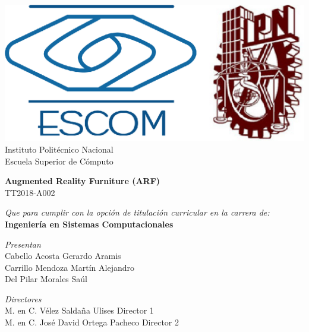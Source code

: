 
\begin{titlepage}

    \centering %

    \includegraphics[scale=0.17]{imagenes/escom-ipn} %
    \LARGE{\\ Instituto Polit\'ecnico Nacional}
    \LARGE{\\ Escuela Superior de C\'omputo}
    
    \vspace{1cm} %

    \LARGE \textbf{Augmented Reality Furniture (ARF)}
    \LARGE {\\ TT2018-A002}

    \vspace{1cm} %

    \LARGE \textit{Que para cumplir con la opción de titulación curricular en la carrera de:}
    \LARGE \textbf{\\ Ingeniería en Sistemas Computacionales}

    \vspace{1cm} %

   \textit{Presentan}\\
    Cabello Acosta Gerardo Aramis\\
    Carrillo Mendoza Martín Alejandro \\
    Del Pilar Morales Saúl

    \vspace{1cm} %

   \textit{Directores}\\
    M. en C. Vélez Saldaña Ulises \bigskip Director 1 \\
    M. en C. José David Ortega Pacheco \bigskip  Director 2
\end{titlepage}